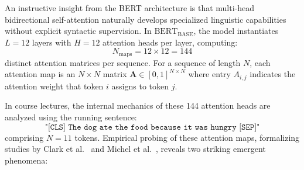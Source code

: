\documentclass[../../main.tex]{subfiles}
\begin{document}
An instructive insight from the BERT architecture is that multi-head bidirectional self-attention naturally develops specialized linguistic capabilities without explicit syntactic supervision. In $\text{BERT}_{\text{BASE}}$, the model instantiates $L=12$ layers with $H=12$ attention heads per layer, computing:
\begin{equation}
N_{\text{maps}} = 12 \times 12 = 144
\label{eq:bert_total_attention_heads}
\end{equation}
distinct attention matrices per sequence. For a sequence of length $N$, each attention map is an $N \times N$ matrix $\mathbf{A} \in [0, 1]^{N \times N}$ where entry $A_{i,j}$ indicates the attention weight that token $i$ assigns to token $j$.

In course lectures, the internal mechanics of these 144 attention heads are analyzed using the running sentence:
\begin{equation*}
\texttt{"[CLS] The dog ate the food because it was hungry [SEP]"}
\end{equation*}
comprising $N=11$ tokens. Empirical probing of these attention maps, formalizing studies by Clark et al.~\cite{clark2019what} and Michel et al.~\cite{michel2019sixteen}, reveals two striking emergent phenomena:
\end{document}
